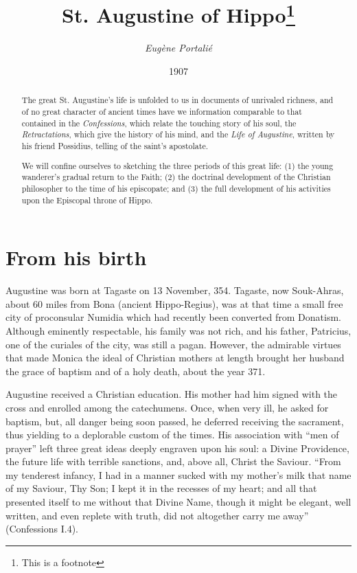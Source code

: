 \documentclass{article}
\title{St. Augustine of Hippo\thanks{This is a footnote}}
\author{\textit{Eugène Portalié}}
\date{\small{1907}}
\begin{document}
\maketitle

\begin{abstract}
The great St. Augustine's life is unfolded to us in documents of unrivaled richness, and of no great character of ancient times have we information comparable to that contained in the \textit{Confessions}, which relate the touching story of his soul, the \textit{Retractations}, which give the history of his mind, and the \textit{Life of Augustine}, written by his friend Possidius, telling of the saint's apostolate.

We will confine ourselves to sketching the three periods of this great life: (1) the young wanderer's gradual return to the Faith; (2) the doctrinal development of the Christian philosopher to the time of his episcopate; and (3) the full development of his activities upon the Episcopal throne of Hippo.
\end{abstract}

\section{From his birth}
Augustine was born at Tagaste on 13 November, 354. Tagaste, now Souk-Ahras, about 60 miles from Bona (ancient Hippo-Regius), was at that time a small free city of proconsular Numidia which had recently been converted from Donatism. Although eminently respectable, his family was not rich, and his father, Patricius, one of the curiales of the city, was still a pagan. However, the admirable virtues that made Monica the ideal of Christian mothers at length brought her husband the grace of baptism and of a holy death, about the year 371.

Augustine received a Christian education. His mother had him signed with the cross and enrolled among the catechumens. Once, when very ill, he asked for baptism, but, all danger being soon passed, he deferred receiving the sacrament, thus yielding to a deplorable custom of the times. His association with ``men of prayer'' left three great ideas deeply engraven upon his soul: a Divine Providence, the future life with terrible sanctions, and, above all, Christ the Saviour. ``From my tenderest infancy, I had in a manner sucked with my mother's milk that name of my Saviour, Thy Son; I kept it in the recesses of my heart; and all that presented itself to me without that Divine Name, though it might be elegant, well written, and even replete with truth, did not altogether carry me away'' (Confessions I.4).
\end{document}
